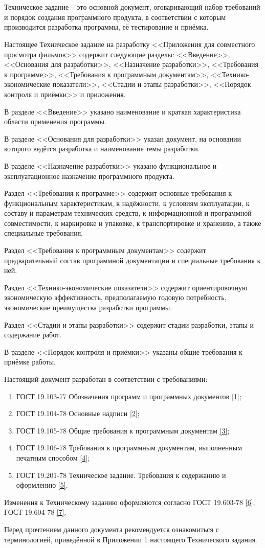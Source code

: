 \section*{}

Техническое задание -- это основной документ, оговаривающий набор требований и порядок создания программного продукта,
в соответствии с которым производится разработка программы, её тестирование и приёмка.

Настоящее Техническое задание на разработку <<Приложения для совместного просмотра фильмов>> содержит следующие разделы:
<<Введение>>, <<Основания для разработки>>, <<Назначение разработки>>, <<Требования к программе>>, <<Требования к программным документам>>,
<<Технико-экономические показатели>>, <<Стадии и этапы разработки>>, <<Порядок контроля и приёмки>> и приложения.

В разделе <<Введение>> указано наименование и краткая характеристика области применения программы.

В разделе <<Основания для разработки>> указан документ, на основании которого ведётся разработка и наименование темы разработки.

В разделе <<Назначение разработки>> указано функциональное и эксплуатационное назначение программного продукта.

Раздел <<Требования к программе>> содержит основные требования к функциональным характеристикам, к надёжности, к условиям
эксплуатации, к составу и параметрам технических средств, к информационной и программной совместимости, к маркировке и
упаковке, к транспортировке и хранению, а также специальные требования.

Раздел <<Требования к программным документам>> содержит предварительный состав программной документации и специальные требования к ней.

Раздел <<Технико-экономические показатели>> содержит ориентировочную экономическую эффективность,
предполагаемую годовую потребность, экономические преимущества разработки программы.

Раздел <<Стадии и этапы разработки>> содержит стадии разработки, этапы и содержание работ.

В разделе <<Порядок контроля и приёмки>> указаны общие требования к приёмке работы.

Настоящий документ разработан в соответствии с требованиями:
\begin{enumerate}
    \item ГОСТ 19.103-77 Обозначения программ и программных документов \hyperref[itm:1]{[1]};
    \item ГОСТ 19.104-78 Основные надписи \hyperref[itm:2]{[2]};
    \item ГОСТ 19.105-78 Общие требования к программным документам \hyperref[itm:3]{[3]};
    \item ГОСТ 19.106-78 Требования к программным документам, выполненным печатным способом \hyperref[itm:4]{[4]};
    \item ГОСТ 19.201-78 Техническое задание.
    Требования к содержанию и оформлению \hyperref[itm:5]{[5]}.
\end{enumerate}

Изменения к Техническому заданию оформляются согласно ГОСТ 19.603-78 \hyperref[itm:6]{[6]}, ГОСТ 19.604-78 \hyperref[itm:7]{[7]}.

Перед прочтением данного документа рекомендуется ознакомиться с терминологией, приведённой в Приложении 1 настоящего
Технического задания.